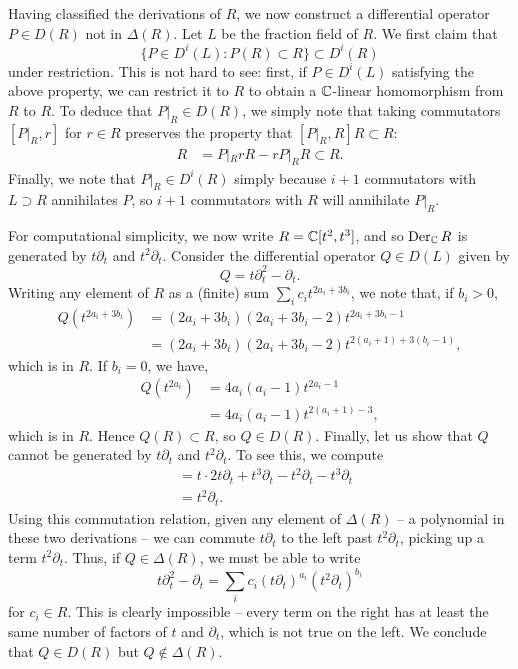 \begin{example}
    Having classified the derivations of $R$, we now construct a differential operator
    $P\in D(R)$ not in $\Delta(R)$. Let $L$ be the fraction field of $R$. We first claim that
    \[\{P\in D^i(L):P(R)\subset R\}\subset D^i(R)\]
    under restriction.
    This is not hard to see: first, if $P\in D^i(L)$ satisfying the above property, we can restrict it to $R$
    to obtain a $\mathbb{C}$-linear homomorphism from $R$ to $R$. To deduce that $P|_R\in D(R)$, we simply note that
    taking commutators $[P|_R,r]$ for $r\in R$ preserves the property that $[P|_R, R]R\subset R$:
    \begin{align*}
        [P|_R,r] R &= P|_Rr R - rP|_R R \subset R.
    \end{align*}
    Finally, we note that $P|_R\in D^i(R)$ simply because $i+1$ commutators with $L\supset R$
    annihilates $P$, so $i+1$ commutators with $R$ will annihilate $P|_R$.
    
    For computational simplicity, we now write $R=\mathbb{C}[t^2,t^3]$, and so
    $\operatorname{Der}_{\mathbb{C}} R$ is generated by $t\partial_t$ and $t^2\partial_t$. Consider the differential operator $Q\in D(L)$ given by
    \[Q = t\partial_t^2-\partial_t.\]
    Writing any element of $R$ as a (finite) sum $\sum_i c_it^{2a_i+3b_i}$, we note that,
    if $b_i>0$,
    \begin{align*}
        Q(t^{2a_i+3b_i}) &= (2a_i+3b_i)(2a_i+3b_i-2)t^{2a_i+3b_i-1}\\
        &= (2a_i+3b_i)(2a_i+3b_i-2)t^{2(a_i+1)+3(b_i-1)},
    \end{align*}
    which is in $R$. If $b_i=0$, we have,
    \begin{align*}
        Q(t^{2a_i}) &= 4a_i(a_i-1)t^{2a_i-1}\\
        &= 4a_i(a_i-1)t^{2(a_i+1)-3},
    \end{align*}
    which is in $R$. Hence $Q(R)\subset R$, so $Q\in D(R)$.
    Finally, let us show that $Q$ cannot be generated by $t\partial_t$ and $t^2\partial_t$.
    To see this, we compute
    \begin{align*}
        [t\partial_t, t^2\partial_t] &= t\cdot 2t\partial_t + t^3\partial_t - t^2\partial_t - t^3\partial_t\\
        &= t^2\partial_t.
    \end{align*}
    Using this commutation relation, given any element of $\Delta(R)$ -- a polynomial in these
    two derivations -- we can commute $t\partial_t$ to the left past $t^2\partial_t$, picking up
    a term $t^2\partial_t$. Thus, if $Q\in\Delta(R)$, we must be able to write
    \[t\partial_t^2-\partial_t = \sum_i c_i(t\partial_t)^{a_i}(t^2\partial_t)^{b_i}\]
    for $c_i\in R$. This is clearly impossible -- every term on the right has at least the same
    number of factors of $t$ and $\partial_t$, which is not true on the left.
    We conclude that $Q\in D(R)$ but $Q\notin\Delta(R)$.
\end{example}

